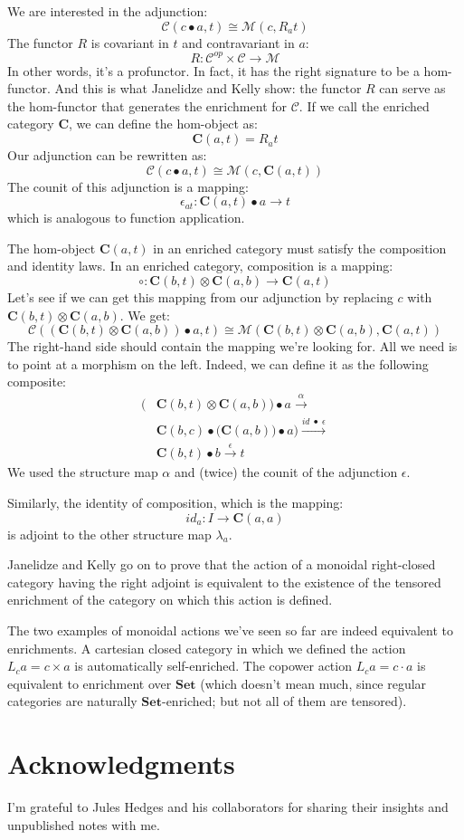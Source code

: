 \documentclass[11pt]{amsart}
\begin{document}
We are interested in the adjunction:
\[ \mathcal{C}( c \bullet a, t) \cong \mathcal{M}(c, R_a t) \]
The functor $R$ is covariant in $t$ and contravariant in $a$:
\[ R \colon \mathcal{C}^{op} \times \mathcal{C} \to \mathcal{M} \]
In other words, it's a profunctor. In fact, it has the right signature to be a hom-functor. And this is what Janelidze and Kelly show: the functor $R$ can serve as the hom-functor that generates the enrichment for $\mathcal{C}$. If we call the enriched category $\mathbf{C}$, we can define the hom-object as:
\[\mathbf{C}(a, t) = R_a t \]
Our adjunction can be rewritten as:
\[ \mathcal{C}( c \bullet a, t) \cong \mathcal{M}(c, \mathbf{C}(a, t)) \]
The counit of this adjunction is a mapping:
\[ \epsilon_{a t} \colon \mathbf{C}(a, t)  \bullet a \to t \]
which is analogous to function application.

The hom-object $\mathbf{C}(a, t)$ in an enriched category must satisfy the composition and identity laws. In an enriched category, composition is a mapping:
\[ \circ \colon \mathbf{C}(b, t) \otimes \mathbf{C}(a, b) \to \mathbf{C}(a, t) \]
Let's see if we can get this mapping from our adjunction by replacing $c$ with $\mathbf{C}(b, t) \otimes \mathbf{C}(a, b)$. We get:
\[ \mathcal{C}( (\mathbf{C}(b, t) \otimes \mathbf{C}(a, b)) \bullet a, t) \cong \mathcal{M}(\mathbf{C}(b, t) \otimes \mathbf{C}(a, b), \mathbf{C}(a, t)) \]
The right-hand side should contain the mapping we're looking for. All we need is to point at a morphism on the left. Indeed, we can define it as the following composite:
\begin{align*}
\big( & \mathbf{C}(b, t) \otimes \mathbf{C}(a, b)\big) \bullet a  \xrightarrow{\alpha}
\\ &\mathbf{C}(b, c) \bullet \big(\mathbf{C}(a, b)) \bullet a\big)   \xrightarrow{id \; \bullet \; \epsilon}
\\ &\mathbf{C}(b, t) \bullet b  \xrightarrow{\epsilon} t
\end{align*}
We used the structure map $\alpha$ and (twice) the counit of the adjunction $\epsilon$.

Similarly, the identity of composition, which is the mapping:
\[ id_a \colon I \to \mathbf{C}(a, a) \]
is adjoint to the other structure map $\lambda_a$.

Janelidze and Kelly go on to prove that the action of a monoidal right-closed category having the right adjoint is equivalent to the existence of the tensored enrichment of the category on which this action is defined.

The two examples of monoidal actions we've seen so far are indeed equivalent to enrichments. A cartesian closed category in which we defined the action $L_c a = c \times a$ is automatically self-enriched. The copower action $L_c a = c \cdot a$ is equivalent to enrichment over $\mathbf{Set}$ (which doesn't mean much, since regular categories are naturally $\mathbf{Set}$-enriched; but not all of them are tensored).

\section{Acknowledgments}
I'm grateful to Jules Hedges and his collaborators for sharing their insights and unpublished notes with me.
\end{document}
